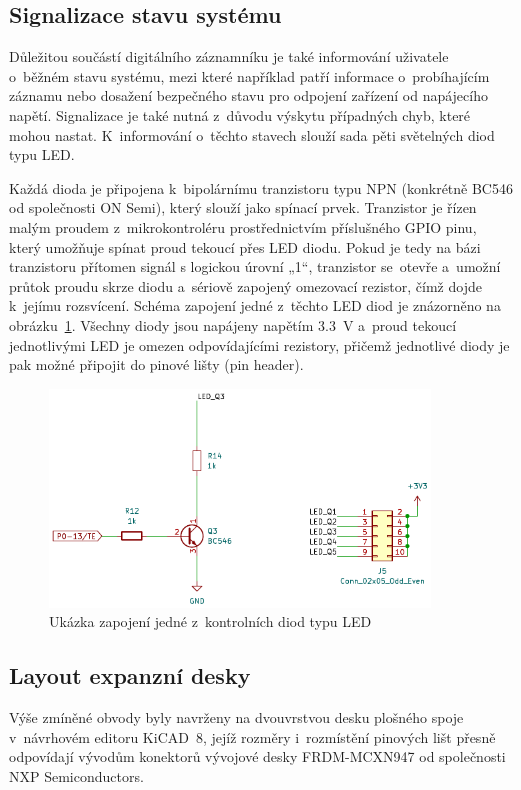 \newpage

\subsection{Signalizace stavu systému}
Důležitou součástí digitálního záznamníku je také informování uživatele o~běžném stavu systému, mezi které například patří informace o~probíhajícím záznamu nebo dosažení bezpečného stavu pro odpojení zařízení od napájecího napětí. Signalizace je také nutná z~důvodu výskytu případných chyb, které mohou nastat. K~informování o~těchto stavech slouží sada pěti světelných diod typu LED.

Každá dioda je připojena k~bipolárnímu tranzistoru typu NPN (konkrétně BC546 od společnosti ON Semi), který slouží jako spínací prvek. Tranzistor je řízen malým proudem z~mikrokontroléru prostřednictvím příslušného GPIO pinu, který umožňuje spínat proud tekoucí přes LED diodu. Pokud je tedy na bázi tranzistoru přítomen signál s logickou úrovní „1“, tranzistor se~otevře a~umožní průtok proudu skrze diodu a~sériově zapojený omezovací rezistor, čímž dojde k~jejímu rozsvícení. Schéma zapojení jedné z~těchto LED diod je znázorněno na obrázku~\ref{fig:control-diodes}. Všechny diody jsou napájeny napětím \SI{3.3}{\volt} a~proud tekoucí jednotlivými LED je omezen odpovídajícími rezistory, přičemž jednotlivé diody je pak možné připojit do pinové lišty (pin header).

\begin{figure}[h]
    \centering
    \includegraphics[width=0.90\textwidth]{obrazky-figures/led-diodes.pdf}
    
    \caption{Ukázka zapojení jedné z~kontrolních diod typu LED}
    \label{fig:control-diodes}
\end{figure}

\newpage

\subsection{Layout expanzní desky}
\label{layout}
Výše zmíněné obvody byly navrženy na dvouvrstvou desku plošného spoje v~návrhovém editoru KiCAD~8, jejíž rozměry i~rozmístění pinových lišt přesně odpovídají vývodům konektorů vývojové desky FRDM-MCXN947 od společnosti NXP Semiconductors.

